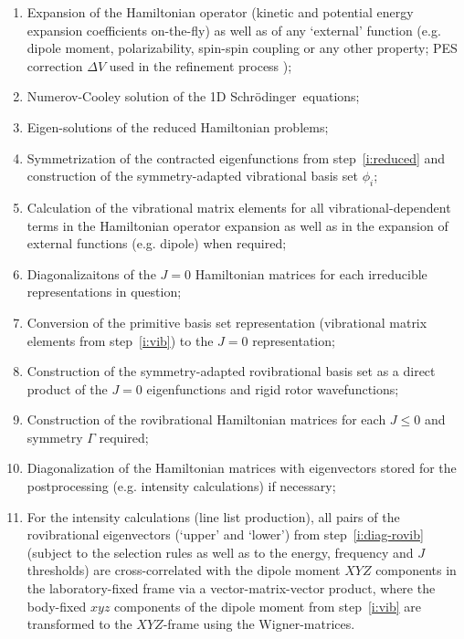 \documentclass[12pt]{article}
\newcommand{\schr}{Schr\"{o}dinger}
\newcommand{\2}{$_{2}$}
\newcommand{\3}{$_{3}$}
\newcommand{\4}{$_{4}$}
\begin{document}
\begin{enumerate}
  \item Expansion of the Hamiltonian operator (kinetic and potential energy expansion coefficients on-the-fly) as well as of any `external' function (e.g. dipole moment, polarizability, spin-spin coupling or any other property; PES correction $\Delta V$ used in the refinement process \cite{11YuBaTe.NH3});
  \item Numerov-Cooley solution of the 1D \schr\ equations;
  \item Eigen-solutions of the reduced Hamiltonian problems; \label{i:reduced}
  \item Symmetrization of the contracted eigenfunctions from step~\ref{i:reduced} and construction of the symmetry-adapted vibrational basis set $\phi_{i}$;
  \item Calculation of the vibrational matrix elements for all vibrational-dependent terms in the Hamiltonian operator expansion as well as in the expansion of external functions (e.g. dipole) when required; \label{i:vib}
  \item Diagonalizaitons of the $J=0$ Hamiltonian matrices for each irreducible representations in question;
  \item Conversion of the primitive basis set representation (vibrational matrix elements from step~\ref{i:vib}) to the $J=0$ representation;\label{i:conv}
  \item Construction of the symmetry-adapted rovibrational basis set as a direct product of the $J=0$ eigenfunctions and rigid rotor wavefunctions;
  \item Construction of the rovibrational Hamiltonian matrices for each $J\le 0$ and symmetry $\Gamma$ required;
  \item Diagonalization of the Hamiltonian matrices with eigenvectors stored for the postprocessing (e.g. intensity calculations) if necessary; \label{i:diag-rovib}
  \item For the intensity calculations (line list production), all pairs of the rovibrational eigenvectors (`upper' and `lower') from step~\ref{i:diag-rovib} (subject to the selection rules as well as to the energy, frequency and $J$ thresholds)  are cross-correlated with the dipole moment $XYZ$ components in the laboratory-fixed frame via a vector-matrix-vector product, where the body-fixed $xyz$ components of the dipole moment from step~\ref{i:vib} are transformed to the $XYZ$-frame using the Wigner-matrices. \label{i:int}
\end{enumerate}
\end{document}
